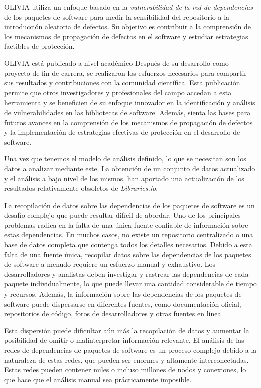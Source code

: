OLIVIA utiliza un enfoque basado en la \textit{vulnerabilidad de la red de dependencias} de los paquetes de software para medir la sensibilidad 
del repositorio a la introducción aleatoria de defectos. Su objetivo es contribuir a la comprensión de los mecanismos de propagación 
de defectos en el software y estudiar estrategias factibles de protección.

OLIVIA está publicado a nivel académico\cite{Seto-Rey20231}
Después de su desarrollo como proyecto de fin de carrera, se realizaron los esfuerzos necesarios para 
compartir sus resultados y contribuciones con la comunidad científica.
Esta publicación permite que otros investigadores y profesionales del campo accedan a esta herramienta y se 
beneficien de su enfoque innovador en la identificación y análisis de vulnerabilidades en las bibliotecas de software. 
Además, sienta las bases para futuros avances
en la comprensión de los mecanismos de propagación de defectos y la implementación de estrategias efectivas de 
protección en el desarrollo de software.

Una vez que tenemos el modelo de análisis definido, lo que se necesitan son los datos a analizar mediante este.
La obtención de un conjunto de datos actualizado y el análisis a bajo nivel de los mismos, han aportado una 
actualización de los resultados relativamente obsoletos de \textit{Libraries.io}.

La recopilación de datos sobre las dependencias de los paquetes de software es un desafío complejo que puede 
resultar difícil de abordar.
Uno de los principales problemas radica en la falta de una única fuente confiable de información sobre estas dependencias.
En muchos casos, no existe un repositorio centralizado o una base de datos completa que contenga todos los detalles necesarios.
Debido a esta falta de una fuente única, recopilar datos sobre las dependencias de los paquetes de software a menudo 
requiere un esfuerzo manual y exhaustivo.
Los desarrolladores y analistas deben investigar y rastrear las dependencias de cada paquete individualmente, lo 
que puede llevar una cantidad considerable de tiempo y recursos.
Además, la información sobre las dependencias de los paquetes de software puede dispersarse en diferentes fuentes, 
como documentación oficial, repositorios de código, foros de desarrolladores y otras fuentes en línea.


Esta dispersión puede dificultar aún más la recopilación de datos y aumentar la posibilidad de omitir o malinterpretar 
información relevante.
El análisis de las redes de dependencias de paquetes de software es un proceso complejo debido a la naturaleza de estas 
redes, que pueden ser enormes y altamente interconectadas. Estas redes pueden contener miles o incluso millones de 
nodos y conexiones, lo que hace que el análisis manual sea prácticamente imposible.


